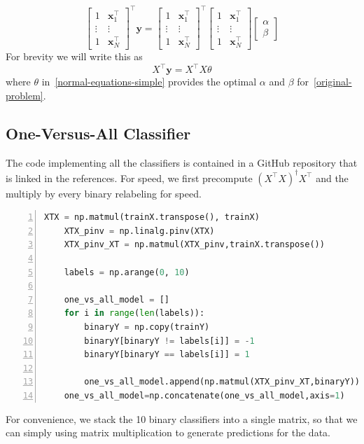 \documentclass{article}
\begin{document}
\begin{equation}\label{normal-equations}
    \begin{bmatrix}
        1 & \mathbf{x}_1^\top \\
        \vdots&\vdots\\
        1 & \mathbf{x}_N^\top
    \end{bmatrix}^\top\mathbf{y} = \begin{bmatrix}
        1 & \mathbf{x}_1^\top \\
        \vdots&\vdots\\
        1 & \mathbf{x}_N^\top
    \end{bmatrix}^\top\begin{bmatrix}
        1 & \mathbf{x}_1^\top \\
        \vdots&\vdots\\
        1 & \mathbf{x}_N^\top
    \end{bmatrix}\begin{bmatrix}
        \alpha \\ \beta
    \end{bmatrix}
\end{equation}
For brevity we will write this as 
\begin{equation}\label{normal-equations-simple}
        X^\top\mathbf{y} = X^\top X\theta
\end{equation}
where $\theta$ in~\ref{normal-equations-simple} provides the optimal $\alpha$ and $\beta$ for~\ref{original-problem}.

\subsection{One-Versus-All Classifier}
The code implementing all the classifiers is contained in a GitHub repository that is linked in the references.
For speed, we first precompute ${(X^\top X)}^\dag X^\top$ and the multiply by every binary relabeling for speed.
\begin{lstlisting}[frame=single,language=Python, numbers=left, breaklines]
    XTX = np.matmul(trainX.transpose(), trainX)
    XTX_pinv = np.linalg.pinv(XTX)
    XTX_pinv_XT = np.matmul(XTX_pinv,trainX.transpose())

    labels = np.arange(0, 10)

    one_vs_all_model = []
    for i in range(len(labels)):
        binaryY = np.copy(trainY)
        binaryY[binaryY != labels[i]] = -1
        binaryY[binaryY == labels[i]] = 1
        
        one_vs_all_model.append(np.matmul(XTX_pinv_XT,binaryY))
    one_vs_all_model=np.concatenate(one_vs_all_model,axis=1)
\end{lstlisting}
For convenience, we stack the 10 binary classifiers into a single matrix, so that we can simply using matrix multiplication to generate predictions for the data.
\end{document}
